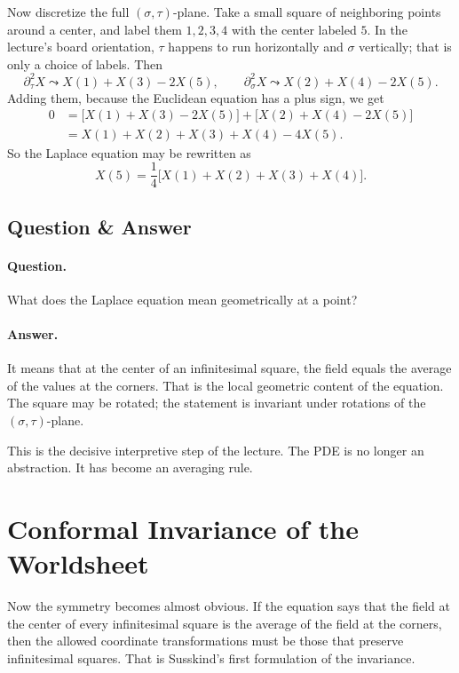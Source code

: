 Now discretize the full \((\sigma,\tau)\)-plane. Take a small square of neighboring points around a center, and label them \(1,2,3,4\) with the center labeled \(5\). In the lecture's board orientation, \(\tau\) happens to run horizontally and \(\sigma\) vertically; that is only a choice of labels. Then
\begin{equation}
\partial_\tau^2 X \leadsto X(1)+X(3)-2X(5),
\qquad
\partial_\sigma^2 X \leadsto X(2)+X(4)-2X(5).
\end{equation}
Adding them, because the Euclidean equation has a plus sign, we get
\begin{align}
0
&=
\bigl[X(1)+X(3)-2X(5)\bigr]
+
\bigl[X(2)+X(4)-2X(5)\bigr] \\
&=
X(1)+X(2)+X(3)+X(4)-4X(5).
\end{align}
So the Laplace equation may be rewritten as
\begin{equation}
X(5)=\frac14\bigl[X(1)+X(2)+X(3)+X(4)\bigr].
\end{equation}

\subsection{Question \& Answer}

\paragraph{Question.} What does the Laplace equation mean geometrically at a point?

\paragraph{Answer.} It means that at the center of an infinitesimal square, the field equals the average of the values at the corners. That is the local geometric content of the equation. The square may be rotated; the statement is invariant under rotations of the \((\sigma,\tau)\)-plane.

This is the decisive interpretive step of the lecture. The PDE is no longer an abstraction. It has become an averaging rule.

\section{Conformal Invariance of the Worldsheet}

Now the symmetry becomes almost obvious. If the equation says that the field at the center of every infinitesimal square is the average of the field at the corners, then the allowed coordinate transformations must be those that preserve infinitesimal squares. That is Susskind's first formulation of the invariance.

